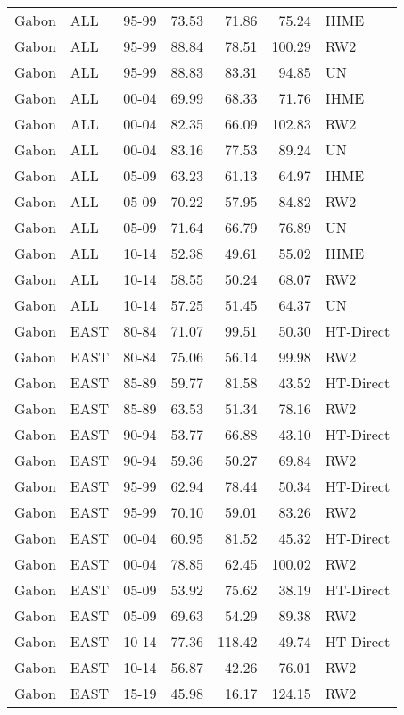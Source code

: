 \begin{longtable}{lllrrrl}
  Gabon & ALL & 95-99 & 73.53 & 71.86 & 75.24 & IHME \\ 
  Gabon & ALL & 95-99 & 88.84 & 78.51 & 100.29 & RW2 \\ 
  Gabon & ALL & 95-99 & 88.83 & 83.31 & 94.85 & UN \\ 
  Gabon & ALL & 00-04 & 69.99 & 68.33 & 71.76 & IHME \\ 
  Gabon & ALL & 00-04 & 82.35 & 66.09 & 102.83 & RW2 \\ 
  Gabon & ALL & 00-04 & 83.16 & 77.53 & 89.24 & UN \\ 
  Gabon & ALL & 05-09 & 63.23 & 61.13 & 64.97 & IHME \\ 
  Gabon & ALL & 05-09 & 70.22 & 57.95 & 84.82 & RW2 \\ 
  Gabon & ALL & 05-09 & 71.64 & 66.79 & 76.89 & UN \\ 
  Gabon & ALL & 10-14 & 52.38 & 49.61 & 55.02 & IHME \\ 
  Gabon & ALL & 10-14 & 58.55 & 50.24 & 68.07 & RW2 \\ 
  Gabon & ALL & 10-14 & 57.25 & 51.45 & 64.37 & UN \\ 
  Gabon & EAST & 80-84 & 71.07 & 99.51 & 50.30 & HT-Direct \\ 
  Gabon & EAST & 80-84 & 75.06 & 56.14 & 99.98 & RW2 \\ 
  Gabon & EAST & 85-89 & 59.77 & 81.58 & 43.52 & HT-Direct \\ 
  Gabon & EAST & 85-89 & 63.53 & 51.34 & 78.16 & RW2 \\ 
  Gabon & EAST & 90-94 & 53.77 & 66.88 & 43.10 & HT-Direct \\ 
  Gabon & EAST & 90-94 & 59.36 & 50.27 & 69.84 & RW2 \\ 
  Gabon & EAST & 95-99 & 62.94 & 78.44 & 50.34 & HT-Direct \\ 
  Gabon & EAST & 95-99 & 70.10 & 59.01 & 83.26 & RW2 \\ 
  Gabon & EAST & 00-04 & 60.95 & 81.52 & 45.32 & HT-Direct \\ 
  Gabon & EAST & 00-04 & 78.85 & 62.45 & 100.02 & RW2 \\ 
  Gabon & EAST & 05-09 & 53.92 & 75.62 & 38.19 & HT-Direct \\ 
  Gabon & EAST & 05-09 & 69.63 & 54.29 & 89.38 & RW2 \\ 
  Gabon & EAST & 10-14 & 77.36 & 118.42 & 49.74 & HT-Direct \\ 
  Gabon & EAST & 10-14 & 56.87 & 42.26 & 76.01 & RW2 \\ 
  Gabon & EAST & 15-19 & 45.98 & 16.17 & 124.15 & RW2 \\ 

\end{longtable}
